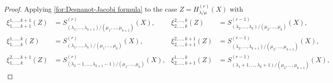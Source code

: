 \documentclass[10pt,a4paper]{amsart}
\begin{document}
\begin{proof}
Applying \eqref{for:Desnanot-Jacobi formula} 
to the case $Z=H^{(r)}_{\lambda/\mu}(X)
 $ with 
\begin{align*}
\xi^{1,\ldots,k+1}_{1,\ldots,k+1}(Z)
&=S^{(r)}_{(\lambda_1,\ldots,\lambda_{k+1})/(\mu_1,\ldots,\mu_{k+1})}(X),
&
\xi^{2,\ldots,k}_{2,\ldots,k}(Z)
&=S^{(r-1)}_{(\lambda_2,\ldots,\lambda_{k})/(\mu_2,\ldots,\mu_{k})}(X),\\
\xi^{1,\ldots,k}_{1,\ldots,k}(Z)
&=S^{(r)}_{(\lambda_1,\ldots,\lambda_{k})/(\mu_1,\ldots,\mu_{k})}(X),
&
\xi^{2,\ldots,k+1}_{2,\ldots,k+1}(Z)
&=S^{(r-1)}_{(\lambda_2,\ldots,\lambda_{k+1})/(\mu_2,\ldots,\mu_{k+1})}(X),\\
\xi^{2,\ldots,k+1}_{1,\ldots,k}(Z)
&=S^{(r)}_{(\lambda_2-1,\ldots,\lambda_{k+1}-1)/(\mu_1,\ldots,\mu_{k})}(X),
&
\xi^{1,\ldots,k}_{2,\ldots,k+1}(Z)
&=S^{(r-1)}_{(\lambda_1+1,\ldots,\lambda_{k}+1)/(\mu_2,\ldots,\mu_{k+1})}(X),
\end{align*}

\end{proof}
\end{document}
